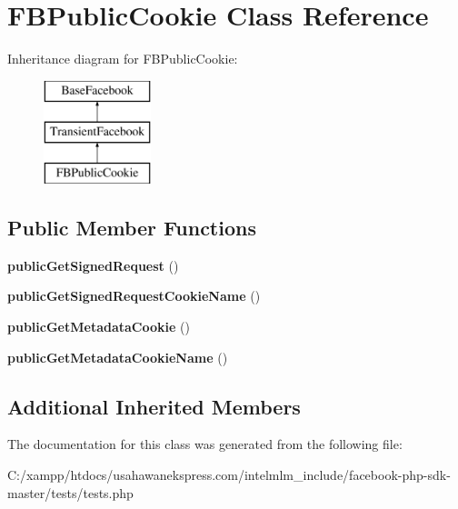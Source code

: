\hypertarget{class_f_b_public_cookie}{\section{F\-B\-Public\-Cookie Class Reference}
\label{class_f_b_public_cookie}
}
Inheritance diagram for F\-B\-Public\-Cookie\-:\begin{figure}[H]
\begin{center}
\leavevmode
\includegraphics[height=3.000000cm]{class_f_b_public_cookie}
\end{center}
\end{figure}
\subsection*{Public Member Functions}
\begin{DoxyCompactItemize}
\item 
\hypertarget{class_f_b_public_cookie_a4d5dce3ac4c056f256220cbf4cc2ab6e}{{\bfseries public\-Get\-Signed\-Request} ()}\label{class_f_b_public_cookie_a4d5dce3ac4c056f256220cbf4cc2ab6e}

\item 
\hypertarget{class_f_b_public_cookie_afe40093958a80ed9db5bf9155f1d75bb}{{\bfseries public\-Get\-Signed\-Request\-Cookie\-Name} ()}\label{class_f_b_public_cookie_afe40093958a80ed9db5bf9155f1d75bb}

\item 
\hypertarget{class_f_b_public_cookie_a1623fc38c912d1dbd732faab78c49802}{{\bfseries public\-Get\-Metadata\-Cookie} ()}\label{class_f_b_public_cookie_a1623fc38c912d1dbd732faab78c49802}

\item 
\hypertarget{class_f_b_public_cookie_ae3a47a284d586f8f645f07770eb8cd36}{{\bfseries public\-Get\-Metadata\-Cookie\-Name} ()}\label{class_f_b_public_cookie_ae3a47a284d586f8f645f07770eb8cd36}

\end{DoxyCompactItemize}
\subsection*{Additional Inherited Members}


The documentation for this class was generated from the following file\-:\begin{DoxyCompactItemize}
\item 
C\-:/xampp/htdocs/usahawanekspress.\-com/intelmlm\-\_\-include/facebook-\/php-\/sdk-\/master/tests/tests.\-php\end{DoxyCompactItemize}
